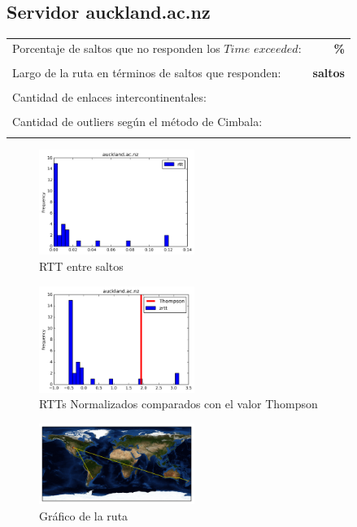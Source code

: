 \subsection{Servidor auckland.ac.nz}

\begin{center}
\begin{tabular}{p{6.5cm}r}
Porcentaje de saltos que no responden los $Time$ $exceeded$: & \textbf{\%} \\ \\ 
Largo de la ruta en términos de saltos que responden: &\textbf{ saltos} \\ \\
Cantidad de enlaces intercontinentales: & \textbf{} \\ \\
Cantidad de outliers según el método de Cimbala: & \textbf{} \\ \\
\end{tabular}
\end{center}

\begin{figure}[H]
  \centering
    \includegraphics[width=0.45\textwidth]{histogramas_rtt/auckland-ac-nz.png}
  \caption{RTT entre saltos}
  \label{entropia-s}
\end{figure}

\begin{figure}[H]
  \centering
    \includegraphics[width=0.45\textwidth]{histogramas_thompson/auckland-ac-nz.png}
  \caption{RTTs Normalizados comparados con el valor Thompson}
  \label{entropia-s}
\end{figure}

\begin{figure}[H]
  \centering
    \includegraphics[width=0.45\textwidth]{grafico-rutas/auckland-ac-nz.png}
  \caption{Gráfico de la ruta}
  \label{entropia-s}
\end{figure}




